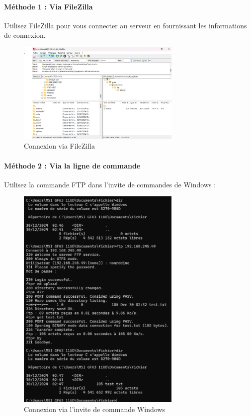 \paragraph{M\'ethode 1 : Via FileZilla}
Utilisez FileZilla pour vous connecter au serveur en fournissant les informations de connexion.

\begin{figure}[h]
	\centering
	\includegraphics[width=0.7\textwidth]{FTP/fire.png}
	\caption{Connexion via FileZilla}
	\label{fig:filezilla}
\end{figure}

\paragraph{M\'ethode 2 : Via la ligne de commande}
Utilisez la commande FTP dans l'invite de commandes de Windows :
\newpage
\begin{figure}[h]
	\centering
	\includegraphics[width=0.7\textwidth]{FTP/test.png}
	\caption{Connexion via l'invite de commande Windows}
	\label{fig:cmd}
\end{figure}




